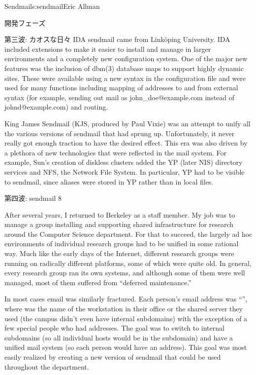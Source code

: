 \begin{aosachapter}{Sendmail}{s:sendmail}{Eric Allman}
\begin{aosasect1}{開発フェーズ}
\begin{aosasect2}{第三波: カオスな日々}
IDA sendmail came from Link\"{o}ping University.  IDA included extensions
to make it easier to install and manage in larger environments and a
completely new configuration system. One of the major new features was
the inclusion of dbm(3) database maps to support highly dynamic
sites. These were available using a new syntax in the configuration
file and were used for many functions including mapping of addresses
to and from external syntax (for example, sending out mail as
john\_doe@example.com instead of johnd@example.com) and routing.

King James Sendmail (KJS, produced by Paul Vixie) was an attempt to
unify all the various versions of sendmail that had sprung
up. Unfortunately, it never really got enough traction to have the
desired effect.  This era was also driven by a plethora of new
technologies that were reflected in the mail system. For example,
Sun's creation of diskless clusters added the YP (later NIS) directory
services and NFS, the Network File System.  In particular, YP had to be
visible to sendmail,
since aliases were stored in YP rather than in local files.

\end{aosasect2}

\begin{aosasect2}{第四波: sendmail 8}

After several years, I returned to Berkeley as a staff member. My job
was to manage a group installing and supporting shared infrastructure
for research around the Computer Science department. For that to
succeed, the largely ad hoc environments of individual research groups
had to be unified in some rational way. Much like the early days of
the Internet, different research groups were running on radically
different platforms, some of which were quite old. In general, every
research group ran its own systems, and although some of them were
well managed, most of them suffered from ``deferred maintenance.''

In most cases email was similarly fractured. Each person's email
address was ``'', where  was
the name of the workstation in their office or the shared server they
used (the campus didn't even have internal subdomains) with the
exception of a few special people who had  addresses. The
goal was to switch to internal subdomains (so all individual hosts
would be in the  subdomain) and have a unified
mail system (so each person would have an 
address). This goal was most easily realized by creating a new version
of sendmail that could be used throughout the department.


\end{aosasect2}
\end{aosasect1}
\end{aosachapter}

